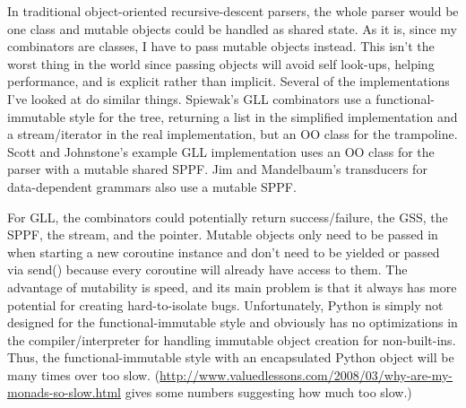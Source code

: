 \documentclass[12pt]{article}
\begin{document}
In traditional object-oriented recursive-descent parsers, the whole
parser would be one class and mutable objects could be handled as
shared state.  As it is, since my combinators are classes, I have to
pass mutable objects instead.  This isn't the worst thing in the world
since passing objects will avoid self look-ups, helping performance,
and is explicit rather than implicit.  Several of the implementations
I've looked at do similar things.  Spiewak's GLL combinators use a
functional-immutable style for the tree, returning a list in the
simplified implementation and a stream/iterator in the real
implementation, but an OO class for the trampoline.  Scott and
Johnstone's example GLL implementation uses an OO class for the parser
with a mutable shared SPPF.  Jim and Mandelbaum's transducers for
data-dependent grammars also use a mutable SPPF.

For GLL, the combinators could potentially return success/failure, the
GSS, the SPPF, the stream, and the pointer.  Mutable objects only need
to be passed in when starting a new coroutine instance and don't need
to be yielded or passed via send() because every coroutine will
already have access to them.  The advantage of mutability is speed,
and its main problem is that it always has more potential for creating
hard-to-isolate bugs.  Unfortunately, Python is simply not designed
for the functional-immutable style and obviously has no optimizations
in the compiler/interpreter for handling immutable object creation for
non-built-ins.  Thus, the functional-immutable style with an
encapsulated Python object will be many times over too slow.
(\url{http://www.valuedlessons.com/2008/03/why-are-my-monads-so-slow.html}
gives some numbers suggesting how much too slow.)
\end{document}
